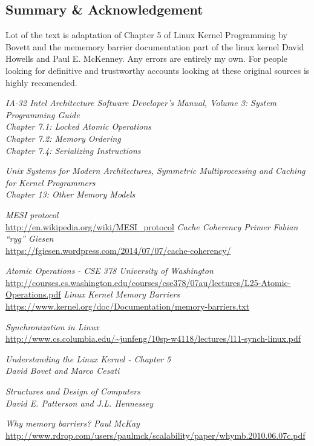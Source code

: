 \documentclass{article}
\begin{document}
\subsection{Summary & Acknowledgement}

Lot of the text is adaptation of Chapter 5 of Linux Kernel Programming
by Bovett and the mememory barrier documentation part of the linux
kernel David Howells and Paul E. McKenney. Any errors are entirely my
own. For people looking for definitive and trustworthy accounts
looking at these original sources is highly recomended.

\begin{thebibliography}{9}

  \textit{IA-32 Intel Architecture Software Developer's Manual, Volume 3:
    System Programming Guide} \\
  \textit{Chapter 7.1: Locked Atomic Operations} \\
  \textit{Chapter 7.2: Memory Ordering}  \\
  \textit{Chapter 7.4: Serializing Instructions}

  \textit{Unix Systems for Modern Architectures, Symmetric Multiprocessing and Caching
    for Kernel Programmers} \\
  \textit{Chapter 13: Other Memory Models}  
  
  \textit{MESI protocol}  \\
  \url{http://en.wikipedia.org/wiki/MESI_protocol}
   \textit{Cache Coherency Primer}  \textit{Fabian “ryg” Giesen} \\
   \url{https://fgiesen.wordpress.com/2014/07/07/cache-coherency/}

   \textit{Atomic Operations - CSE 378 University of Washington} \\
  \url{http://courses.cs.washington.edu/courses/cse378/07au/lectures/L25-Atomic-Operations.pdf}
  \textit{Linux Kernel Memory Barriers} \\
  \url{https://www.kernel.org/doc/Documentation/memory-barriers.txt}

  \textit{Synchronization in Linux} \\
  \url{http://www.cs.columbia.edu/~junfeng/10sp-w4118/lectures/l11-synch-linux.pdf}

  \textit{Understanding the Linux Kernel - Chapter 5} \\
  \textit{David Bovet and Marco Cesati}  

  \textit{Structures and Design of Computers } \\
  \textit{David E. Patterson and J.L. Hennessey} 
  
  \textit{Why memory barriers?}
  \textit{Paul McKay}
  \url{http://www.rdrop.com/users/paulmck/scalability/paper/whymb.2010.06.07c.pdf}


\end{thebibliography}
\end{document}
